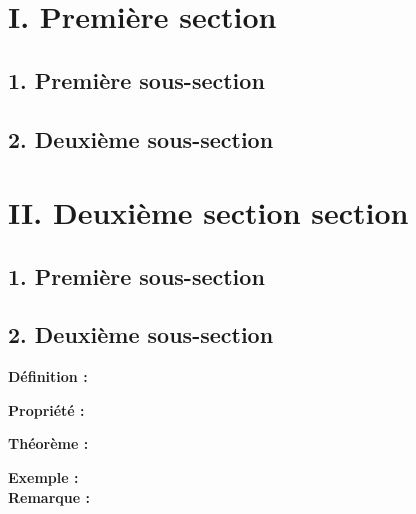 \documentclass[11pt,a4paper]{article}
\title{\doctitre}
\author{\doctheme - \doctype}
\date{}
\begin{document}
\maketitle
\pagestyle{custom}
\thispagestyle{custom}

\section*{I. Première section}
\subsection*{1. Première sous-section}
\subsection*{2. Deuxième sous-section}
\section*{II. Deuxième section section}
\subsection*{1. Première sous-section}
\subsection*{2. Deuxième sous-section}

\begin{mdframed}[style=definitionStyle]
  \textbf{Définition :} ~\\
\end{mdframed}

\begin{mdframed}[style=proprieteStyle]
	\textbf{Propriété :} ~\\
\end{mdframed}

\begin{mdframed}[style=proprieteStyle]
	\textbf{Théorème :} ~\\
\end{mdframed}

\textbf{Exemple :} ~\\

\textbf{Remarque :} %
\end{document}
